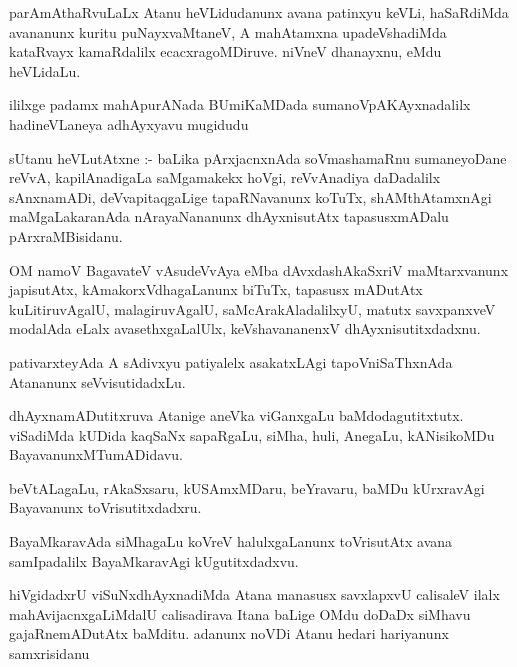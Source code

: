 \documentclass{article}
\begin{document}
\begin{mn}
parAmAthaRvuLaLx Atanu heVLidudanunx avana  patinxyu keVLi, haSaRdiMda avananunx 
kuritu  puNayxvaMtaneV,  A mahAtamxna  upadeVshadiMda kataRvayx kamaRdalilx 
ecacxragoMDiruve. niVneV dhanayxnu, eMdu heVLidaLu.
\end{mn}

\begin{mn}
ililxge padamx mahApurANada BUmiKaMDada sumanoVpAKAyxnadalilx hadineVLaneya adhAyxyavu mugidudu
\end{mn}




\begin{mn}
sUtanu heVLutAtxne :- baLika pArxjacnxnAda  soVmashamaRnu sumaneyoDane reVvA, 
kapilAnadigaLa  saMgamakekx hoVgi,  reVvAnadiya daDadalilx sAnxnamADi, 
deVvapitaqgaLige tapaRNavanunx koTuTx, shAMthAtamxnAgi maMgaLakaranAda 
nArayaNananunx dhAyxnisutAtx tapasusxmADalu pArxraMBisidanu.
\end{mn}

\begin{mn}
OM namoV BagavateV vAsudeVvAya eMba dAvxdashAkaSxriV maMtarxvanunx japisutAtx, 
kAmakorxVdhagaLanunx biTuTx, tapasusx mADutAtx kuLitiruvAgalU, malagiruvAgalU, 
saMcArakAladalilxyU, matutx savxpanxveV modalAda eLalx avasethxgaLalUlx, 
keVshavananenxV dhAyxnisutitxdadxnu.
\end{mn}

\begin{mn}
pativarxteyAda A sAdivxyu patiyalelx asakatxLAgi tapoVniSaThxnAda Atananunx  seVvisutidadxLu.
\end{mn}

\begin{mn}
dhAyxnamADutitxruva Atanige aneVka viGanxgaLu  baMdodagutitxtutx. viSadiMda 
kUDida kaqSaNx sapaRgaLu, siMha, huli, AnegaLu, kANisikoMDu BayavanunxMTumADidavu.
\end{mn}

\begin{mn}
beVtALagaLu, rAkaSxsaru, kUSAmxMDaru, beYravaru, baMDu kUrxravAgi Bayavanunx toVrisutitxdadxru.
\end{mn}

\begin{mn}
BayaMkaravAda siMhagaLu koVreV halulxgaLanunx toVrisutAtx avana samIpadalilx 
BayaMkaravAgi kUgutitxdadxvu.
\end{mn}

\begin{mn}
hiVgidadxrU viSuNxdhAyxnadiMda Atana manasusx savxlapxvU calisaleV ilalx  
mahAvijacnxgaLiMdalU  calisadirava  Itana baLige OMdu doDaDx siMhavu gajaRnemADutAtx 
baMditu.  adanunx noVDi Atanu hedari hariyanunx samxrisidanu
\end{mn}
\end{document}
